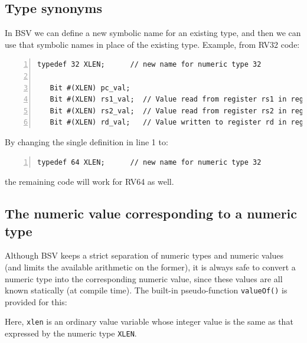 \subsection{Type synonyms}

\label{BSV_Type_synonyms}


In BSV we can define a new symbolic name for an existing type, and
then we can use that symbolic names in place of the existing
type. Example, from RV32 code:

{\small
\begin{Verbatim}[frame=single, numbers=left]
   typedef 32 XLEN;      // new name for numeric type 32

   Bit #(XLEN) pc_val;
   Bit #(XLEN) rs1_val;  // Value read from register rs1 in register file
   Bit #(XLEN) rs2_val;  // Value read from register rs2 in register file
   Bit #(XLEN) rd_val;   // Value written to register rd in register file
\end{Verbatim}
}

By changing the single definition in line 1 to:

{\small
\begin{Verbatim}[frame=single, numbers=left]
   typedef 64 XLEN;      // new name for numeric type 32
\end{Verbatim}
}

the remaining code will work for RV64 as well.


\subsection{The numeric value corresponding to a numeric type}

\label{BSV_value_of_numeric_type}


Although BSV keeps a strict separation of numeric types and numeric
values (and limits the available arithmetic on the former), it is
always safe to convert a numeric type into the corresponding numeric
value, since these values are all known statically (at compile time).
The built-in pseudo-function \verb|valueOf()| is provided for this:



Here, \verb|xlen| is an ordinary value variable whose integer value is
the same as that expressed by the numeric type \verb|XLEN|.

